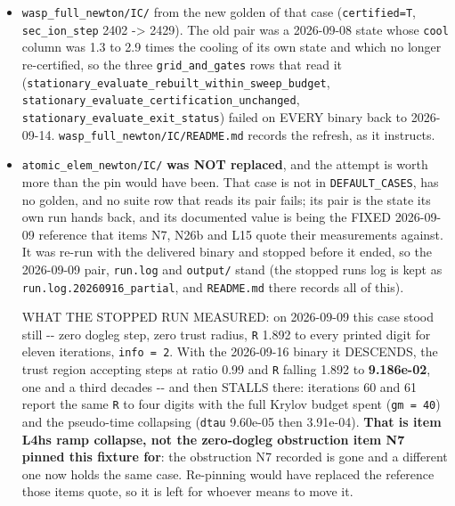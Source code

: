 \documentclass[english,a4paper]{my_memo}
\begin{document}
\begin{itemize}
\item
  \texttt{wasp\_full\_newton/IC/} from the new golden of that case (\texttt{certified=T},
  \texttt{sec\_ion\_step} 2402 -\textgreater{} 2429). The old pair was a 2026-09-08 state whose
  \texttt{cool} column was 1.3 to 2.9 times the cooling of its own state and which no
  longer re-certified, so the three \texttt{grid\_and\_gates} rows that read it
  (\texttt{stationary\_evaluate\_rebuilt\_within\_sweep\_budget},
  \texttt{stationary\_evaluate\_certification\_unchanged},
  \texttt{stationary\_evaluate\_exit\_status}) failed on EVERY binary back to 2026-09-14.
  \texttt{wasp\_full\_newton/IC/README.md} records the refresh, as it instructs.
\item
  \texttt{atomic\_elem\_newton/IC/} \textbf{was NOT replaced}, and the attempt is worth more
  than the pin would have been. That case is not in \texttt{DEFAULT\_CASES}, has no
  golden, and no suite row that reads its pair fails; its pair is the state its
  own run hands back, and its documented value is being the FIXED 2026-09-09
  reference that items N7, N26b and L15 quote their measurements against. It
  was re-run with the delivered binary and stopped before it ended, so the
  2026-09-09 pair, \texttt{run.log} and \texttt{output/} stand (the stopped run\textquotesingle s log is kept
  as \texttt{run.log.20260916\_partial}, and \texttt{README.md} there records all of this).

  WHAT THE STOPPED RUN MEASURED: on 2026-09-09 this case stood still -\/- zero
  dogleg step, zero trust radius, \texttt{\textbar{}\textbar{}R\textbar{}\textbar{}} 1.892 to every printed digit for
  eleven iterations, \texttt{info\ =\ 2}. With the 2026-09-16 binary it DESCENDS, the
  trust region accepting steps at ratio 0.99 and \texttt{\textbar{}\textbar{}R\textbar{}\textbar{}} falling 1.892 to
  \textbf{9.186e-02}, one and a third decades -\/- and then STALLS there: iterations
  60 and 61 report the same \texttt{\textbar{}\textbar{}R\textbar{}\textbar{}} to four digits with the full Krylov budget
  spent (\texttt{gm\ =\ 40}) and the pseudo-time collapsing (\texttt{dtau} 9.60e-05 then
  3.91e-04). \textbf{That is item L4h\textquotesingle s ramp collapse, not the zero-dogleg
  obstruction item N7 pinned this fixture for}: the obstruction N7 recorded is
  gone and a different one now holds the same case. Re-pinning would have
  replaced the reference those items quote, so it is left for whoever means to
  move it.
\end{itemize}
\end{document}
